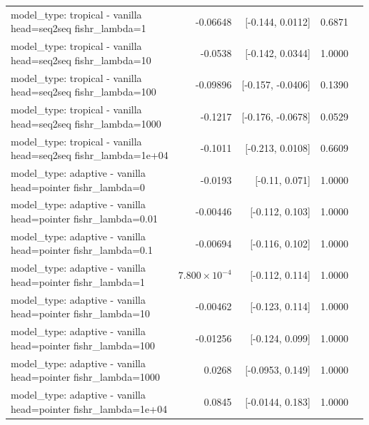 \documentclass[10pt]{article}
\makeatletter
\newcommand{\stackcell}[1]{\begin{tabular}[t]{@{}l@{}}#1\end{tabular}}
\makeatother
\begin{document}
{\begin{longtable}{lrrrl}
\stackcell{model\_type: tropical - vanilla\\\footnotesize head=seq2seq fishr\_lambda=1 } & -0.06648 & [-0.144, 0.0112] & 0.6871 & \\
\stackcell{model\_type: tropical - vanilla\\\footnotesize head=seq2seq fishr\_lambda=10 } & -0.0538 & [-0.142, 0.0344] & 1.0000 & \\
\stackcell{model\_type: tropical - vanilla\\\footnotesize head=seq2seq fishr\_lambda=100 } & -0.09896 & [-0.157, -0.0406] & 0.1390 & \\
\stackcell{model\_type: tropical - vanilla\\\footnotesize head=seq2seq fishr\_lambda=1000 } & -0.1217 & [-0.176, -0.0678] & 0.0529 & \\
\stackcell{model\_type: tropical - vanilla\\\footnotesize head=seq2seq fishr\_lambda=1e+04 } & -0.1011 & [-0.213, 0.0108] & 0.6609 & \\
\stackcell{model\_type: adaptive - vanilla\\\footnotesize head=pointer fishr\_lambda=0 } & -0.0193 & [-0.11, 0.071] & 1.0000 & \\
\stackcell{model\_type: adaptive - vanilla\\\footnotesize head=pointer fishr\_lambda=0.01 } & -0.00446 & [-0.112, 0.103] & 1.0000 & \\
\stackcell{model\_type: adaptive - vanilla\\\footnotesize head=pointer fishr\_lambda=0.1 } & -0.00694 & [-0.116, 0.102] & 1.0000 & \\
\stackcell{model\_type: adaptive - vanilla\\\footnotesize head=pointer fishr\_lambda=1 } & $7.800\times10^{-4}$ & [-0.112, 0.114] & 1.0000 & \\
\stackcell{model\_type: adaptive - vanilla\\\footnotesize head=pointer fishr\_lambda=10 } & -0.00462 & [-0.123, 0.114] & 1.0000 & \\
\stackcell{model\_type: adaptive - vanilla\\\footnotesize head=pointer fishr\_lambda=100 } & -0.01256 & [-0.124, 0.099] & 1.0000 & \\
\stackcell{model\_type: adaptive - vanilla\\\footnotesize head=pointer fishr\_lambda=1000 } & 0.0268 & [-0.0953, 0.149] & 1.0000 & \\
\stackcell{model\_type: adaptive - vanilla\\\footnotesize head=pointer fishr\_lambda=1e+04 } & 0.0845 & [-0.0144, 0.183] & 1.0000 & \\

\end{longtable}}
\end{document}
